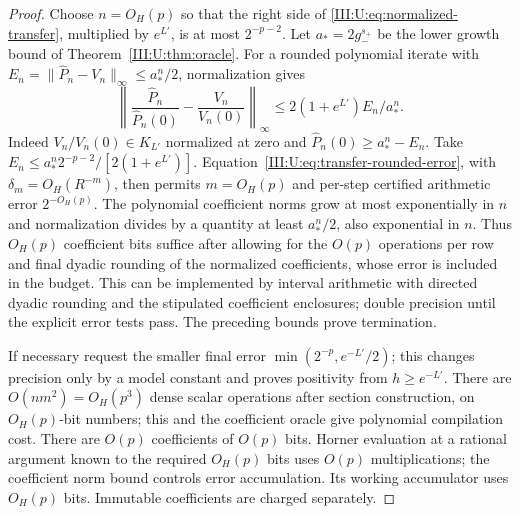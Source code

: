 \begin{proof}
Choose $n=O_H(p)$ so that the right side of
\eqref{III:U:eq:normalized-transfer}, multiplied by $e^{L'}$, is at most
$2^{-p-2}$. Let $a_*=2g_-^{s_+}$ be the lower growth bound of
Theorem~\ref{III:U:thm:oracle}. For a rounded polynomial iterate with
$E_n=\|\widehat P_n-V_n\|_\infty\le a_*^n/2$, normalization gives
\[
 \left\|\frac{\widehat P_n}{\widehat P_n(0)}-
                  \frac{V_n}{V_n(0)}\right\|_\infty
 \le 2(1+e^{L'})E_n/a_*^n.
\]
Indeed $V_n/V_n(0)\in K_{L'}$ normalized at zero and
$\widehat P_n(0)\ge a_*^n-E_n$.
Take $E_n\le a_*^n2^{-p-2}/[2(1+e^{L'})]$.
Equation~\eqref{III:U:eq:transfer-rounded-error}, with
$\delta_m=O_H(R^{-m})$, then permits $m=O_H(p)$ and per-step
certified arithmetic error $2^{-O_H(p)}$. The polynomial coefficient
norms grow at most exponentially in $n$ and normalization divides
by a quantity at least $a_*^n/2$, also exponential in $n$.
Thus $O_H(p)$ coefficient bits suffice after allowing for the
$O(p)$ operations per row and final dyadic rounding of the normalized
coefficients, whose error is included in the budget. This can be
implemented by interval arithmetic with directed dyadic rounding
and the stipulated coefficient enclosures; double precision until
the explicit error tests pass. The preceding bounds prove termination.

If necessary request the smaller final error
$\min(2^{-p},e^{-L'}/2)$; this changes precision only by a model
constant and proves positivity from $h\ge e^{-L'}$.
There are $O(nm^2)=O_H(p^3)$ dense scalar operations after section
construction, on $O_H(p)$-bit numbers; this and the coefficient oracle
give polynomial compilation cost. There are $O(p)$ coefficients of
$O(p)$ bits. Horner evaluation at a rational argument known to the
required $O_H(p)$ bits uses $O(p)$ multiplications; the coefficient
norm bound controls error accumulation. Its working accumulator uses
$O_H(p)$ bits. Immutable coefficients are charged separately.
\end{proof}
